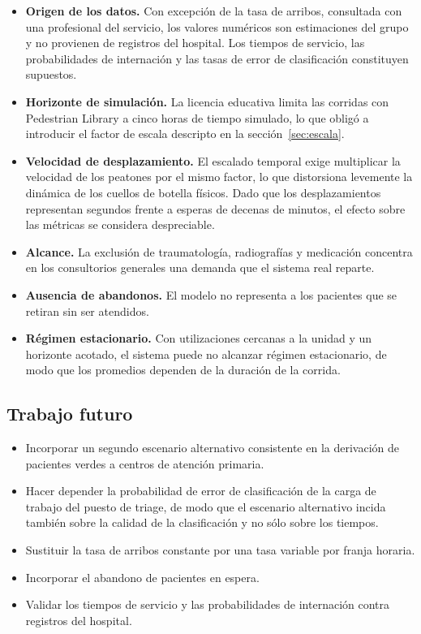 \begin{itemize}
  \item \textbf{Origen de los datos.} Con excepción de la tasa de arribos,
  consultada con una profesional del servicio, los valores numéricos son
  estimaciones del grupo y no provienen de registros del hospital. Los
  tiempos de servicio, las probabilidades de internación y las tasas de error
  de clasificación constituyen supuestos.
  \item \textbf{Horizonte de simulación.} La licencia educativa limita las
  corridas con Pedestrian Library a cinco horas de tiempo simulado, lo que
  obligó a introducir el factor de escala descripto en la
  sección~\ref{sec:escala}.
  \item \textbf{Velocidad de desplazamiento.} El escalado temporal exige
  multiplicar la velocidad de los peatones por el mismo factor, lo que
  distorsiona levemente la dinámica de los cuellos de botella físicos. Dado
  que los desplazamientos representan segundos frente a esperas de decenas de
  minutos, el efecto sobre las métricas se considera despreciable.
  \item \textbf{Alcance.} La exclusión de traumatología, radiografías y
  medicación concentra en los consultorios generales una demanda que el
  sistema real reparte.
  \item \textbf{Ausencia de abandonos.} El modelo no representa a los
  pacientes que se retiran sin ser atendidos.
  \item \textbf{Régimen estacionario.} Con utilizaciones cercanas a la unidad
  y un horizonte acotado, el sistema puede no alcanzar régimen estacionario,
  de modo que los promedios dependen de la duración de la corrida.
\end{itemize}

\subsection{Trabajo futuro}

\begin{itemize}
  \item Incorporar un segundo escenario alternativo consistente en la
  derivación de pacientes verdes a centros de atención primaria.
  \item Hacer depender la probabilidad de error de clasificación de la carga
  de trabajo del puesto de triage, de modo que el escenario alternativo
  incida también sobre la calidad de la clasificación y no sólo sobre los
  tiempos.
  \item Sustituir la tasa de arribos constante por una tasa variable por
  franja horaria.
  \item Incorporar el abandono de pacientes en espera.
  \item Validar los tiempos de servicio y las probabilidades de internación
  contra registros del hospital.
\end{itemize}

